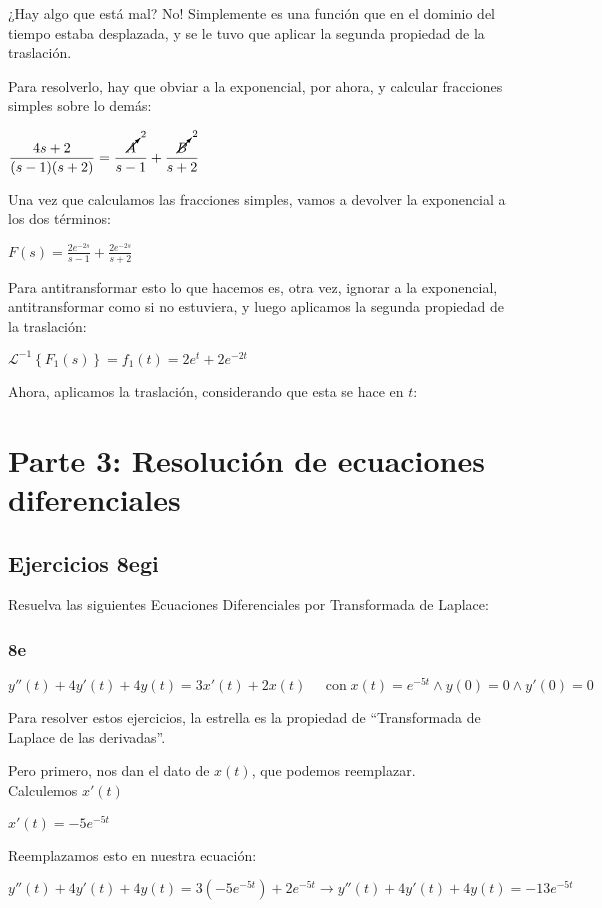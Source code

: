 \documentclass[11pt]{article}
\newcommand{\ilapl}[1]{\mathscr{L}^{-1} \left\lbrace {#1} \right\rbrace}
\begin{document}
	¿Hay algo que está mal? No! Simplemente es una función que en el dominio del tiempo estaba desplazada, y se le tuvo que aplicar la segunda propiedad de la traslación.
	
	Para resolverlo, hay que obviar a la exponencial, por ahora, y calcular fracciones simples sobre lo demás:
	
	$\displaystyle \frac{4s+2}{(s-1)(s+2)}=\frac{\cancelto{2}{A}}{s-1}+\frac{\cancelto{2}{B}}{s+2}$
	
	Una vez que calculamos las fracciones simples, vamos a devolver la exponencial a los dos términos:
	
	$\displaystyle F(s)=\frac{2e^{-2s}}{s-1}+\frac{2e^{-2s}}{s+2}$
	
	Para antitransformar esto lo que hacemos es, otra vez, ignorar a la exponencial, antitransformar como si no estuviera, y luego aplicamos la segunda propiedad de la traslación:
	
	$\ilapl{F_{1}(s)}=f_{1}(t)=2e^t+2e^{-2t}$
	
	Ahora, aplicamos la traslación, considerando que esta se hace en $t$:
	
	
	\section{Parte 3: Resolución de ecuaciones diferenciales}
	\subsection{Ejercicios 8egi}
	Resuelva las siguientes Ecuaciones Diferenciales por Transformada de Laplace:
	\subsubsection{8e}
	$y''(t)+4y'(t)+4y(t)=3x'(t)+2x(t) \;\;\;\;\; \mathrm{con} \; x(t)=e^{-5t} \wedge y(0)=0 \wedge y'(0)=0$
	
	Para resolver estos ejercicios, la estrella es la propiedad de ``Transformada de Laplace de las derivadas''.
	
	Pero primero, nos dan el dato de $x(t)$, que podemos reemplazar.\\
	Calculemos $x'(t)$
	
	$x'(t)=-5e^{-5t}$
	
	Reemplazamos esto en nuestra ecuación:
	
	$y''(t)+4y'(t)+4y(t)=3\left(-5e^{-5t}\right)+2e^{-5t} \rightarrow \boxed{y''(t)+4y'(t)+4y(t)=-13e^{-5t}}$
	
\end{document}
